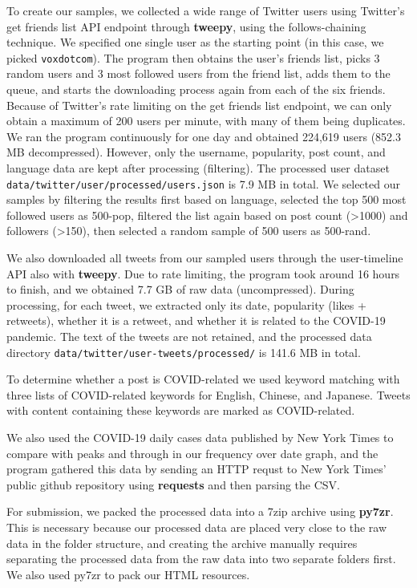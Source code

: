 \documentclass{article}
\begin{document}
    To create our samples, we collected a wide range of Twitter users using Twitter's get friends list API endpoint through \textbf{tweepy}, using the follows-chaining technique. We specified one single user as the starting point (in this case, we picked \verb|voxdotcom|). The program then obtains the user's friends list, picks 3 random users and 3 most followed users from the friend list, adds them to the queue, and starts the downloading process again from each of the six friends. Because of Twitter's rate limiting on the get friends list endpoint, we can only obtain a maximum of 200 users per minute, with many of them being duplicates. We ran the program continuously for one day and obtained 224,619 users (852.3 MB decompressed). However, only the username, popularity, post count, and language data are kept after processing (filtering). The processed user dataset \verb|data/twitter/user/processed/users.json| is 7.9 MB in total. We selected our samples by filtering the results first based on language, selected the top 500 most followed users as 500-pop, filtered the list again based on post count (>1000) and followers (>150), then selected a random sample of 500 users as 500-rand.

    We also downloaded all tweets from our sampled users through the user-timeline API also with \textbf{tweepy}. Due to rate limiting, the program took around 16 hours to finish, and we obtained 7.7 GB of raw data (uncompressed). During processing, for each tweet, we extracted only its date, popularity (likes + retweets), whether it is a retweet, and whether it is related to the COVID-19 pandemic. The text of the tweets are not retained, and the processed data directory \verb|data/twitter/user-tweets/processed/| is 141.6 MB in total.

    To determine whether a post is COVID-related we used keyword matching with three lists of COVID-related keywords for English, Chinese, and Japanese. Tweets with content containing these keywords are marked as COVID-related.

    We also used the COVID-19 daily cases data published by New York Times to compare with peaks and through in our frequency over date graph, and the program gathered this data by sending an HTTP requst to New York Times' public github repository using \textbf{requests} and then parsing the CSV.

    For submission, we packed the processed data into a 7zip archive using \textbf{py7zr}. This is necessary because our processed data are placed very close to the raw data in the folder structure, and creating the archive manually requires separating the processed data from the raw data into two separate folders first. We also used py7zr to pack our HTML resources.
\end{document}
